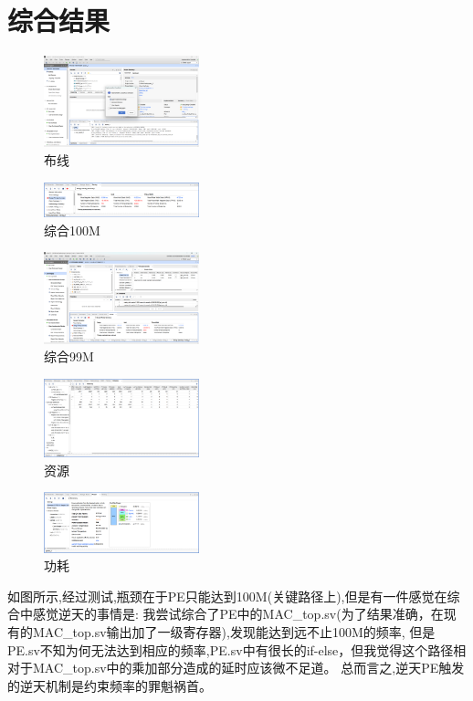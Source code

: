 \documentclass[zihao=-4, UTF8]{ctexart}
\begin{document}
\section{综合结果}
\begin{figure}[H]
      \centering
      \includegraphics[width=0.4\textwidth]{布线.png}
      \caption{布线}
      \label{fig:布线}
    \end{figure}
\begin{figure}[H]
      \centering
      \includegraphics[width=0.4\textwidth]{综合100M.png}
      \caption{综合100M}
      \label{fig:综合100M}
    \end{figure}
\begin{figure}[H]
      \centering
      \includegraphics[width=0.4\textwidth]{综合99M.png}
      \caption{综合99M}
      \label{fig:综合99M}
    \end{figure}
\begin{figure}[H]
  \centering
  \includegraphics[width=0.4\textwidth]{资源.png}
  \caption{资源}
  \label{fig:资源}
\end{figure}
\begin{figure}[H]
  \centering
  \includegraphics[width=0.4\textwidth]{功耗.png}
  \caption{功耗}
  \label{fig:功耗}
\end{figure}
如图所示,经过测试,瓶颈在于PE只能达到100M(关键路径上),但是有一件感觉在综合中感觉逆天的事情是:
我尝试综合了PE中的MAC\_top.sv(为了结果准确，在现有的MAC\_top.sv输出加了一级寄存器),发现能达到远不止100M的频率,
但是PE.sv不知为何无法达到相应的频率,PE.sv中有很长的if-else，但我觉得这个路径相对于MAC\_top.sv中的乘加部分造成的延时应该微不足道。
总而言之,逆天PE触发的逆天机制是约束频率的罪魁祸首。
\end{document}
